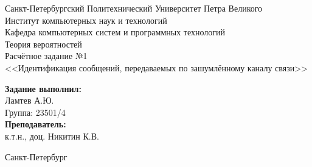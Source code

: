 \begin{titlepage}	%

	\begin{center}		%

		\large Санкт-Петербургский Политехнический Университет Петра Великого\\
		\large Институт компьютерных наук и технологий \\
		\large Кафедра компьютерных систем и программных технологий\\[6cm]
		
		\huge Теория вероятностей \\[0.5cm]
		\large Расчётное задание №1\\[0.1cm]
		\large <<Идентификация сообщений, передаваемых по зашумлённому каналу связи>>\\[6cm]

	\end{center}


	\begin{flushright}
		\begin{minipage}{0.33\textwidth} 
			\begin{flushleft} 

				\large\textbf{Задание выполнил:}\\
				\large Ламтев А.Ю.\\
				\large {Группа:} 23501/4\\
				
				\large \textbf{Преподаватель:}\\
				\large к.т.н., доц. Никитин К.В.

			\end{flushleft}
		\end{minipage}
	\end{flushright}
	
	\vfill 

	\begin{center}
	\large Санкт-Петербург\\
	\large \the\year
	\end{center}

\thispagestyle{empty}
\end{titlepage}

\vfill
